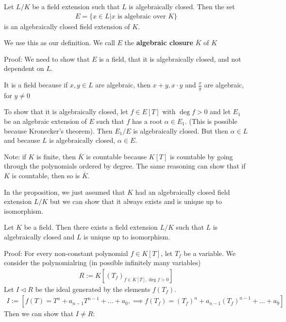 \begin{proposition}[]
	Let $L/K$ be a field extension such that $L$ is algebraically closed. Then the set
	\begin{align*}
		E = \{x \in L \big\vert x \text{ is algebraic over }K\}
	\end{align*}
	is an algebraically closed field extension of $K$.

	We use this as our definition. We call $E$ the \textbf{algebraic closure} $\overline{K}$ of $K$
\end{proposition}
Proof: We need to show that $E$ is a field, that it is algebraically closed, and not dependent on $L$.

It is a field because if $x,y \in L$ are algebraic, then $x+y, x \cdot y$ and $\frac{x}{y}$ are algebraic, for $y \neq 0$

To show that it is algebraically closed, let $f \in E[T]$ with $\deg f > 0$ and let $E_1$ be an algebraic extension of $E$ such that $f$ has a root $\alpha \in E_1$. (This is possible because Kronecker's theorem). Then $E_1 /E$ is algebraically closed. But then $\alpha \in L$ and because $L$ is algebraically closed, $\alpha \in E$.



Note: if $K$ is finite, then $\overline{K}$ is countable because $K[T]$ is countable by going through the polynomials ordered by degree.
The same reasoning can show that if $K$ is countable, then so is $\overline{K}$.

In the proposition, we just assumed that $K$ had an algebraically closed field extension $L/K$ but we can show that it always exists and is unique up to isomorphism.
\begin{theorem}[]
	Let $K$ be a field. Then there exists a field extension $L/K$ such that $L$ is algebraically closed and $L$ is unique up to isomorphism.
\end{theorem}

Proof: For every non-constant polynomial $f \in K[T]$, let $T_f$ be a variable. We consider the polynomialring (in possible infinitely many variables)
\begin{align*}
	R := K\left[(T_f)_{f \in K[T], \deg f > 0}\right]
\end{align*}
Let $I \lhd R$ be the ideal generated by the elements $f(T_f)$. 
\begin{align*}
	I := \left[f(T) = T^{n} + a_{n-1}T^{n-1} + \ldots + a_0, \implies f(T_f) = (T_f)^{n} + a_{n-1}(T_f)^{n-1} + \ldots + a_9\right]
\end{align*}
Then we can show that $I \neq R$:


